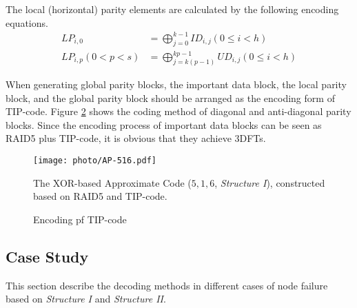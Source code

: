 \documentclass[sigconf]{acmart}
\begin{document}
The local (horizontal) parity elements are calculated by the following encoding equations.
\begin{align}
    LP_{i,0} &= \bigoplus_{j=0}^{k-1} ID_{i,j} (0 \leqslant i < h)\\
    LP_{i,p}(0<p<s) &= \bigoplus_{j=k(p-1)}^{kp-1} UD_{i,j} (0 \leqslant i < h)
\end{align}

When generating global parity blocks, the important data block, the local parity block, and the global parity block should be arranged as the encoding form of TIP-code. Figure \ref{fig-TIP} shows the coding method of diagonal and anti-diagonal parity blocks.
Since the encoding process of important data blocks can be seen as RAID5 plus TIP-code, it is obvious that they achieve 3DFTs.

\begin{figure}[ht]
\centering
\texttt{[image: photo/AP-516.pdf]}
\caption{The XOR-based Approximate Code ($5,1,6$, \emph{Structure I}), constructed based on RAID5 and TIP-code.}
\label{fig-ap-TIP}
\end{figure}

\begin{figure}[ht]

\caption{Encoding pf TIP-code}
\label{fig-TIP}
\end{figure}

\iffalse
\subsection{Case Study}
This section describe the decoding methods in different cases of node failure based on \emph{Structure I} and \emph{Structure II}.
\end{document}
